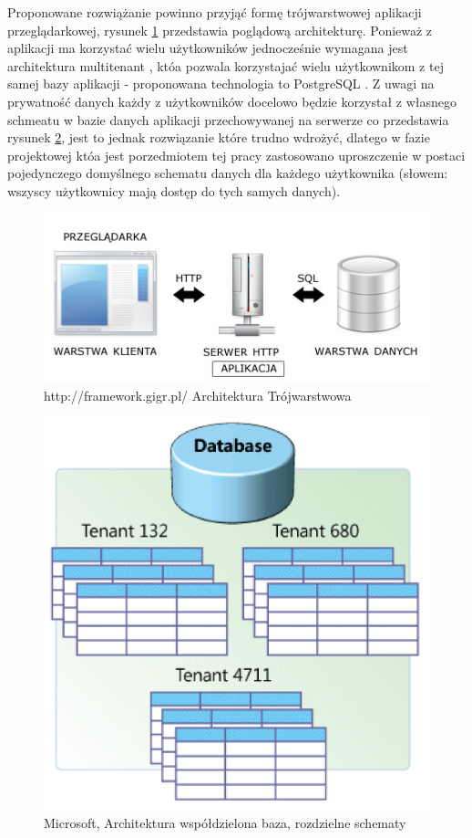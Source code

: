 \documentclass[a4paper,10pt, twoside]{report}
\begin{document}
\begin{large}
\medskip
{Proponowane rozwiążanie powinno przyjąć formę trójwarstwowej aplikacji 
przeglądarkowej, rysunek \ref{fig:architeturatrojwarstwowa} przedstawia 
poglądową architekturę. Ponieważ z aplikacji ma korzystać wielu użytkowników 
jednocześnie wymagana jest architektura multitenant \cite{multitenant}, któa 
pozwala korzystajać wielu użytkownikom z tej samej bazy aplikacji - proponowana 
technologia to PostgreSQL \cite{PostgreSQL}. Z uwagi na prywatność danych każdy 
z użytkowników docelowo będzie korzystał z własnego schmeatu w bazie danych 
aplikacji przechowywanej na serwerze co przedstawia rysunek 
\ref{fig:multitenant}, jest to jednak rozwiązanie które trudno wdrożyć, dlatego 
w fazie projektowej któa jest porzedmiotem tej pracy zastosowano uproszczenie w 
postaci pojedynczego domyślnego schematu danych dla każdego użytkownika 
(słowem: wszyscy użytkownicy mają dostęp do tych samych danych).}

\begin{figure}[H]           %
    \centering  
    \includegraphics[width=12cm]{figures/framwork-gigr-pl_architektura_www.jpg}
    \caption{http://framework.gigr.pl/ Architektura Trójwarstwowa}
    \label{fig:architeturatrojwarstwowa}
\end{figure}

\begin{figure}[H]           %
    \centering  
    \includegraphics[width=12cm]{figures/multitenant_4.png}
    \caption{Microsoft, Architektura współdzielona baza, rozdzielne schematy}
    \label{fig:multitenant}
\end{figure}



\end{large}
\end{document}
